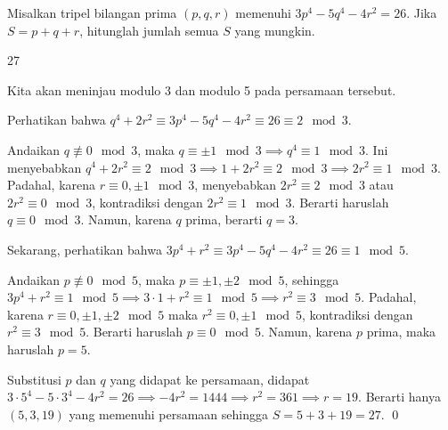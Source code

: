 \documentclass[11pt]{scrartcl}
\begin{document}
	\begin{soalbaru}
		Misalkan tripel bilangan prima $(p,q,r)$ memenuhi $3p^4-5q^4-4r^2=26$. Jika $S = p+q+r$, hitunglah jumlah semua $S$ yang mungkin.
		
		\begin{jawaban}
		27
		\end{jawaban}
		\begin{solusi}
		Kita akan meninjau modulo 3 dan modulo 5 pada persamaan tersebut. 
		
		Perhatikan bahwa $q^4+2r^2 \equiv 3p^4-5q^4-4r^2 \equiv 26 \equiv 2\mod 3$. 
		
		Andaikan $q \not\equiv 0 \mod 3$, maka $q \equiv \pm 1 \mod 3 \implies q^4 \equiv 1 \mod 3$. Ini  menyebabkan $q^4 +2r^2 \equiv 2 \mod 3 \implies 1 + 2r^2 \equiv 2 \mod 3 \implies 2r^2 \equiv 1 \mod 3$. Padahal, karena $r \equiv 0,\pm 1 \mod 3$, menyebabkan $2r^2 \equiv  2 \mod 3$ atau $2r^2 \equiv 0 \mod 3$, kontradiksi dengan $2r^2 \equiv 1 \mod 3$. Berarti haruslah $q \equiv 0 \mod 3$. Namun, karena $q$ prima, berarti $q=3$.
		
		Sekarang, perhatikan bahwa $3p^4+r^2 \equiv 3p^4-5q^4-4r^2 \equiv 26 \equiv 1 \mod 5$.
		
		Andaikan $p \not \equiv 0 \mod 5$, maka $p \equiv \pm1,\pm2 \mod 5$, sehingga $3p^4+r^2 \equiv 1 \mod 5 \implies 3\cdot1+r^2 \equiv 1 \mod 5 \implies r^2 \equiv 3 \mod 5$. Padahal, karena $r \equiv 0,\pm1,\pm2 \mod 5$ maka $r^2 \equiv 0,\pm1 \mod 5$, kontradiksi dengan $r^2 \equiv 3 \mod 5$. Berarti haruslah $p \equiv 0 \mod 5$. Namun, karena $p$ prima, maka haruslah $p=5$.
		
		Substitusi $p$ dan $q$ yang didapat ke persamaan, didapat $3\cdot 5^4 - 5 \cdot 3^4 - 4r^2 = 26 \implies -4r^2 = 1444 \implies r^2 = 361 \implies r = 19$. Berarti hanya $(5,3,19)$ yang memenuhi persamaan sehingga $S=5+3+19=27$. \qed
		\end{solusi}
	\end{soalbaru}
	
\end{document}
